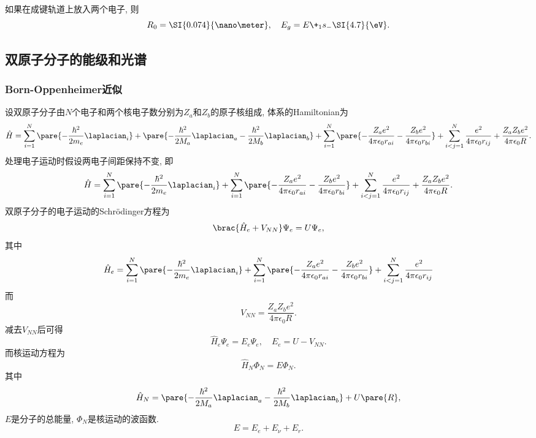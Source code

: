 \documentclass[hidelinks]{ctexart}
\begin{document}
\begin{center}
\end{center}
如果在成键轨道上放入两个电子, 则
\[ R_0 = \SI{0.074}{\nano\meter},\quad E_g = E\+_1s_ - \SI{4.7}{\eV}. \]



\subsection{双原子分子的能级和光谱} %
\label{sub:双原子分子的能级和光谱}

\subsubsection{Born-Oppenheimer近似} %
\label{ssub:born_oppenheimer近似}

设双原子分子由$N$个电子和两个核电子数分别为$Z_a$和$Z_b$的原子核组成, 体系的Hamiltonian为
\[ \hat H = \sum_{i=1}^N\pare{-\frac{\hbar^2}{2m_e}\laplacian_i} + \pare{-\frac{\hbar^2}{2M_a}\laplacian_a - \frac{\hbar^2}{2M_b}\laplacian_b} + \sum_{i=1}^N\pare{-\frac{Z_a e^2}{4\pi\epsilon_0 r_{ai}} - \frac{Z_b e^2}{4\pi\epsilon_0 r_{bi}}} + \sum_{i<j=1}^N \frac{e^2}{4\pi\epsilon_0 r_{ij}} +\frac{Z_aZ_b e^2}{4\pi\epsilon_0 R}. \]
处理电子运动时假设两电子间距保持不变, 即
\[ \hat H = \sum_{i=1}^N\pare{-\frac{\hbar^2}{2m_e}\laplacian_i} +\sum_{i=1}^N\pare{-\frac{Z_a e^2}{4\pi\epsilon_0 r_{ai}} - \frac{Z_b e^2}{4\pi\epsilon_0 r_{bi}}} + \sum_{i<j=1}^N \frac{e^2}{4\pi\epsilon_0 r_{ij}} + \frac{Z_aZ_b e^2}{4\pi\epsilon_0 R}. \]
双原子分子的电子运动的Schr\"odinger方程为
\[ \brac{\hat H_e + V_{NN}}\Psi_e = U\Psi_e, \]
其中
\[ \hat H_e = \sum_{i=1}^N\pare{-\frac{\hbar^2}{2m_e}\laplacian_i} +\sum_{i=1}^N\pare{-\frac{Z_a e^2}{4\pi\epsilon_0 r_{ai}} - \frac{Z_b e^2}{4\pi\epsilon_0 r_{bi}}} + \sum_{i<j=1}^N \frac{e^2}{4\pi\epsilon_0 r_{ij}} \]
而
\[ V_{NN} = \frac{Z_aZ_b e^2}{4\pi\epsilon_0 R}. \]
减去$V_{NN}$后可得
\[ \hat H_e \Psi_e = E_e \Psi_e,\quad E_e = U - V_{NN}. \]
而核运动方程为
\[ \hat H_N \Phi_N = E\Phi_N. \]
其中
\[ \hat H_N = \pare{-\frac{\hbar^2}{2M_a}\laplacian_a - \frac{\hbar^2}{2M_b}\laplacian_b} + U\pare{R}, \]
$E$是分子的总能量, $\Phi_N$是核运动的波函数.
\[ E = E_e + E_\nu + E_r. \]
\end{document}

